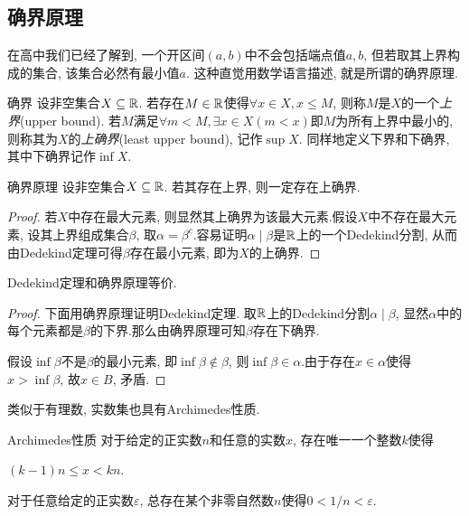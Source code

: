\subsection{确界原理}

在高中我们已经了解到, 一个开区间$(a, b)$中不会包括端点值$a, b$, 但若取其上界构成的集合, 该集合必然有最小值$a$. 这种直觉用数学语言描述, 就是所谓的确界原理. 

\begin{definition}{确界}
	设非空集合$X \subseteq \mathbb{R}$. 若存在$M \in \mathbb{R}$使得$\forall x \in X, x \leq M$, 则称$M$是$X$的一个\textit{上界}(upper bound). 若$M$满足$\forall m<M, \exists x \in X (m<x)$即$M$为所有上界中最小的, 则称其为$X$的\textit{上确界}(least upper bound), 记作$\sup X$. 同样地定义下界和下确界, 其中下确界记作$\inf X$.
\end{definition}

\begin{theorem}{确界原理}
	设非空集合$X \subseteq \mathbb{R}$. 若其存在上界, 则一定存在上确界.
\end{theorem}
\begin{proof}
	若$X$中存在最大元素, 则显然其上确界为该最大元素.假设$X$中不存在最大元素, 设其上界组成集合$\beta$, 取$\alpha = \beta ^c$.容易证明$\alpha \mid \beta$是$\mathbb{R}$上的一个Dedekind分割, 从而由Dedekind定理可得$\beta$存在最小元素, 即为$X$的上确界.
\end{proof}

\begin{proposition}{}
	Dedekind定理和确界原理等价.
\end{proposition}
\begin{proof}
	下面用确界原理证明Dedekind定理. 取$\mathbb{R}$上的Dedekind分割$\alpha \mid \beta$, 显然$\alpha$中的每个元素都是$\beta$的下界.那么由确界原理可知$\beta$存在下确界. 
	
	假设$\inf \beta$不是$\beta$的最小元素, 即$\inf \beta \notin \beta$, 则$\inf \beta \in \alpha$.由于存在$x \in \alpha$使得$x > \inf \beta$, 故$x \in B$, 矛盾. 
\end{proof}

类似于有理数, 实数集也具有Archimedes性质.

\begin{theorem}{Archimedes性质}
	对于给定的正实数$n$和任意的实数$x$, 存在唯一一个整数$k$使得
	\begin{center}
		$(k-1)n \leq x < kn.$
	\end{center}
\end{theorem}

\begin{corollary}{}
	对于任意给定的正实数$\varepsilon$, 总存在某个非零自然数$n$使得$0<1/n<\varepsilon$.
\end{corollary}

